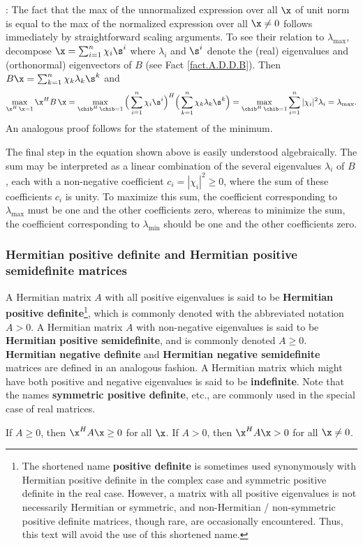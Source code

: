 \/:   The fact that the max of the unnormalized expression over all $\x$ of unit norm is equal to the
max of the normalized expression over all $\x\ne 0$ follows immediately by straightforward scaling arguments.
To see their relation to $\lambda_{\max}$, decompose $\x=\sum_{i=1}^{n} \chi_{i} \s^{i}$ where
$\lambda_{i}$ and $\s^{i}$ denote the (real) eigenvalues and (orthonormal) eigenvectors of $B$ (see Fact \ref{fact.A.D.D.B}).
Then $B\x=\sum_{k=1}^{n}\chi_{k}\lambda_{k}\s^{k}$ and
\begin{equation*}
    \max_{\x^H\,\x=1} {\x^H B\, \x} = \max_{\chib^H\,\chib=1} \Big(\sum_{i=1}^{n}\chi_{i}\s^{i}\Big)^{H}
    \Big(\sum_{k=1}^{n}\chi_{k}\lambda_{k}\s^{k}\Big) = \max_{\chib^H\,\chib=1} \sum_{i=1}^{n} |\chi_{i}|^{2} \lambda_{i} = \lambda_{\max}.
\end{equation*}
An analogous proof follows for the statement of the minimum. \endproof \medskip

The final step in the equation shown above is easily understood algebraically.  
The sum may be interpreted as a linear combination of the several eigenvalues $\lambda_i$ of $B$, each with
a non-negative coefficient $c_i=|\chi_{i}|^{2}\ge 0$, where the sum of these coefficients $c_i$ is unity.
To maximize this sum, the coefficient corresponding to $\lambda_{\max}$ must be one and the other coefficients zero, whereas
to minimize the sum, the coefficient corresponding to $\lambda_{\min}$ should be one and the other coefficients zero.

\subsubsection{Hermitian positive definite and Hermitian positive semidefinite matrices}\label{sec.posdef}

\noindent A Hermitian matrix $A$ with all positive eigenvalues is said to be {\bf Hermitian positive definite}\footnote{The shortened name {\bf positive definite} is sometimes
used synonymously with {Hermitian positive definite} in the complex case and {symmetric positive definite} in the real case.  However, a matrix
with all positive eigenvalues is not necessarily Hermitian or symmetric, and non-Hermitian / non-symmetric positive definite matrices, though rare,
are occasionally encountered.  Thus, this text will avoid the use of this shortened name.}, which
is commonly denoted with the abbreviated notation $A>0$.  A Hermitian
matrix $A$ with non-negative eigenvalues is said to be {\bf Hermitian positive semidefinite},
and is commonly denoted $A\ge 0$.  {\bf Hermitian negative definite} and {\bf Hermitian negative semidefinite} matrices are defined in an
analogous fashion.  A Hermitian matrix which might have both positive and negative eigenvalues is said to be {\bf indefinite}.
Note that the names {\bf symmetric positive definite}, etc., are commonly used in the special case of real matrices.
\begin{fact} \label{fact.spd}
If $A\ge 0$, then $\x^{H}A\x \ge 0$ for all $\x$.
If $A>0$, then $\x^{H}A\x>0$ for all $\x \ne 0$.
\end{fact}

